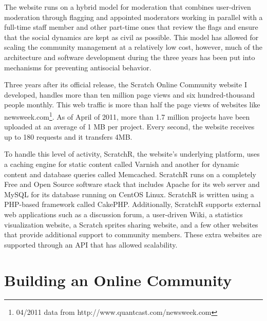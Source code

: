 The website runs on a hybrid model for moderation that combines user-driven moderation through flagging and appointed moderators working in parallel with a full-time staff member and other part-time ones that review the flags and ensure that the social dynamics are kept as civil as possible. 
This model has allowed for scaling the community management at a relatively low cost, however, much of the architecture and software development during the three years has been put into mechanisms for preventing antisocial behavior.

Three years after its official release, the Scratch Online Community website I developed, handles more than ten million page views and six hundred-thousand people monthly.
This web traffic is more than half the page views of websites like newsweek.com\footnote{04/2011 data from http://www.quantcast.com/newsweek.com}.
As of April of 2011, more than 1.7 million projects have been uploaded at an average of 1 MB per project. 
Every second, the website receives up to 180 requests and it transfers 4MB.

To handle this level of activity, ScratchR, the website's underlying platform, uses a caching engine for static content called Varnish and another for dynamic content and database queries called Memcached. 
ScratchR runs on a completely Free and Open Source software stack that includes Apache for its web server and MySQL for its database running on CentOS Linux. 
ScratchR is written using a PHP-based framework called CakePHP.
Additionally, ScratchR supports external  web applications such as a discussion forum, a user-driven Wiki, a statistics visualization website, a Scratch sprites sharing website, and a few other websites that provide additional support to community members. 
These extra websites are supported through an API that has allowed scalability.

\section{Building an Online Community}

